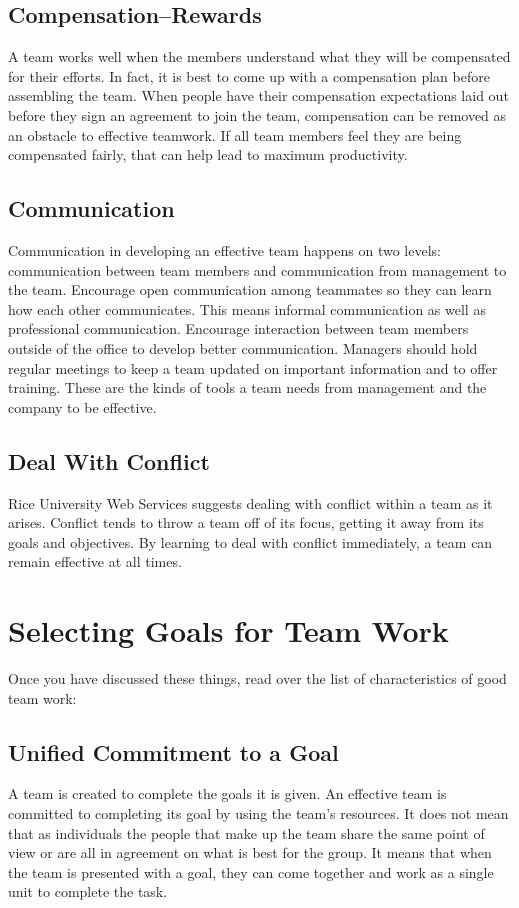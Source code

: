 \documentclass{article}\usepackage[]{graphicx}\usepackage[]{color}
\begin{document}
\subsection{Compensation--Rewards}
A team works well when the members understand what they will be compensated for their efforts. In fact, it is best to come up with a compensation plan before assembling the team. When people have their compensation expectations laid out before they sign an agreement to join the team, compensation can be removed as an obstacle to effective teamwork. If all team members feel they are being compensated fairly, that can help lead to maximum productivity.

\subsection{Communication}
Communication in developing an effective team happens on two levels: communication between team members and communication from management to the team. Encourage open communication among teammates so they can learn how each other communicates. This means informal communication as well as professional communication. Encourage interaction between team members outside of the office to develop better communication. Managers should hold regular meetings to keep a team updated on important information and to offer training. These are the kinds of tools a team needs from management and the company to be effective.

\subsection{Deal With Conflict}

Rice University Web Services suggests dealing with conflict within a team as it arises. Conflict tends to throw a team off of its focus, getting it away from its goals and objectives. By learning to deal with conflict immediately, a team can remain effective at all times.

\section{Selecting Goals for Team Work} 

Once you have discussed these things, read over the list of characteristics of good team work: 

\subsection{Unified Commitment to a Goal}
A team is created to complete the goals it is given. An effective team is committed to completing its goal by using the team's resources. It does not mean that as individuals the people that make up the team share the same point of view or are all in agreement on what is best for the group. It means that when the team is presented with a goal, they can come together and work as a single unit to complete the task.
\end{document}
